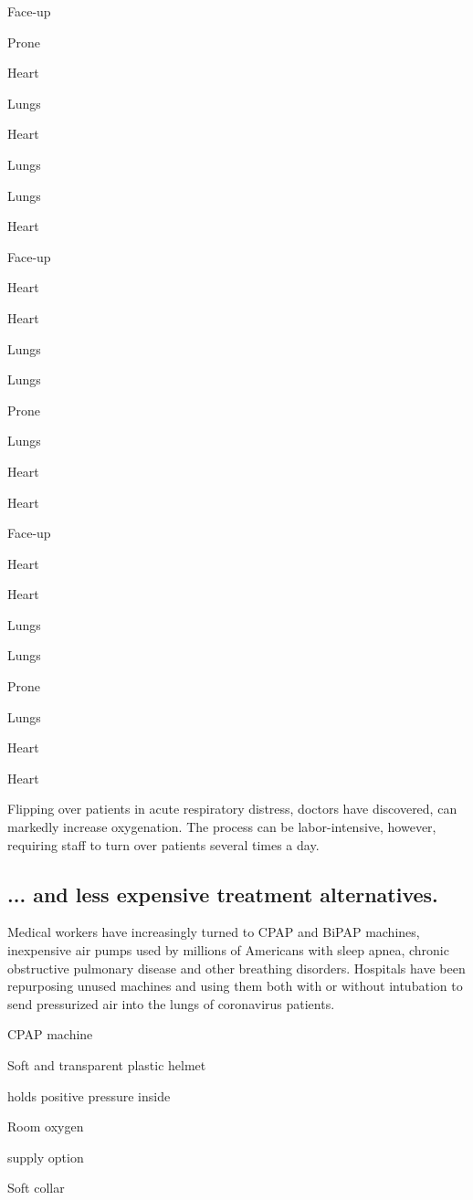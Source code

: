 Face-up

Prone

Heart

Lungs

Heart

Lungs

Lungs

Heart

Face-up

Heart

Heart

Lungs

Lungs

Prone

Lungs

Heart

Heart

Face-up

Heart

Heart

Lungs

Lungs

Prone

Lungs

Heart

Heart

Flipping over patients in acute respiratory distress, doctors have
discovered, can markedly increase oxygenation. The process can be
labor-intensive, however, requiring staff to turn over patients several
times a day.

\hypertarget{-and-less-expensive-treatment-alternatives}{%
\subsection{... and less expensive treatment
alternatives.}\label{-and-less-expensive-treatment-alternatives}}

Medical workers have increasingly turned to CPAP and BiPAP machines,
inexpensive air pumps used by millions of Americans with sleep apnea,
chronic obstructive pulmonary disease and other breathing disorders.
Hospitals have been repurposing unused machines and using them both with
or without intubation to send pressurized air into the lungs of
coronavirus patients.

CPAP machine

Soft and transparent plastic helmet

holds positive pressure inside

Room oxygen

supply option

Soft collar

